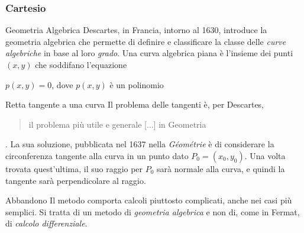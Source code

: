 \begin{frame}[label=Cartesio]
    \frametitle{Cartesio}
    \begin{block}{Geometria Algebrica}
        Descartes, in Francia, intorno al 1630, introduce la \alert{geometria algebrica}
        che permette di definire e classificare la classe delle \textit{curve algebriche}
        in base al loro \textit{grado}.
        Una curva algebrica piana è l'insieme dei punti $(x,y)$ che soddifano l'equazione
        \begin{center}
            $p(x,y) = 0$, dove $p(x,y)$ è un polinomio
        \end{center}
    \end{block}
    \pause
    \begin{block}{Retta tangente a una curva}
        Il problema delle tangenti è, per Descartes, \begin{quote}
            il problema più utile e generale [...] in Geometria
        \end{quote}.
        La sua soluzione, pubblicata nel 1637 nella \textit{Géométrie} è di considerare 
        la circonferenza tangente alla curva in un punto dato $P_0=(x_0,y_0)$. Una volta trovata quest'ultima, il suo
        raggio per $P_0$ sarà normale alla curva, e quindi la tangente sarà
        perpendicolare al raggio.
    \end{block}
    \pause
    \begin{alertblock}{Abbandono}
        Il metodo comporta calcoli piuttosto complicati, anche nei casi più semplici.
        Si tratta di un metodo di \textit{geometria algebrica} e non di, come in Fermat,
        di \textit{calcolo differenziale}.
    \end{alertblock}

\end{frame}